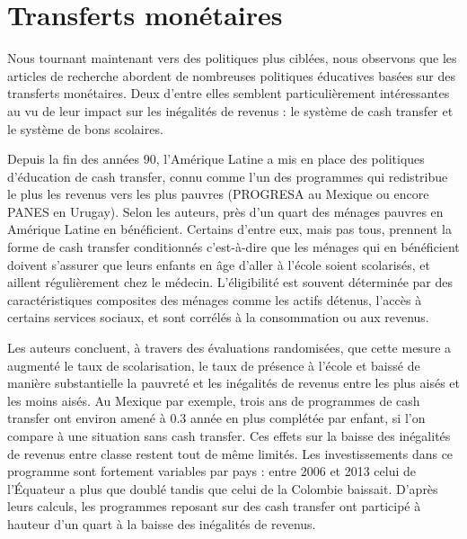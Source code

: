 \documentclass[pagesize, twoside=off, bibliography=totoc, DIV=calc, fontsize=12pt, a4paper, french]{scrartcl}
\begin{document}
\section{Transferts monétaires}

\label{sec_transferts}

Nous tournant maintenant vers des politiques plus ciblées, nous observons que les articles de recherche abordent de nombreuses politiques éducatives basées sur des transferts monétaires. Deux d’entre elles semblent particulièrement intéressantes au vu de leur impact sur les inégalités de revenus : le système de cash transfer et le système de bons scolaires.

Depuis la fin des années 90, l’Amérique Latine a mis en place des politiques d’éducation de cash transfer, connu comme l’un des programmes qui redistribue le plus les revenus vers les plus pauvres (PROGRESA au Mexique ou encore PANES en Urugay). Selon les auteurs, près d’un quart des ménages pauvres en Amérique Latine en bénéficient. Certains d’entre eux, mais pas tous, prennent la forme de cash transfer conditionnés c’est-à-dire que les ménages qui en bénéficient doivent s’assurer que leurs enfants en âge d’aller à l’école soient scolarisés, et aillent régulièrement chez le médecin. L’éligibilité est souvent déterminée par des caractéristiques composites des ménages comme les actifs détenus, l’accès à certains services sociaux, et sont corrélés à la consommation ou aux revenus. 

Les auteurs concluent, à travers des évaluations randomisées, que cette mesure a augmenté le taux de scolarisation, le taux de présence à l’école et baissé de manière substantielle la pauvreté et les inégalités de revenus entre les plus aisés et les moins aisés. Au Mexique par exemple, trois ans de programmes de cash transfer ont environ amené à 0.3 année en plus complétée par enfant, si l’on compare à une situation sans cash transfer. Ces effets sur la baisse des inégalités de revenus entre classe restent tout de même limités. Les investissements dans ce programme sont fortement variables par pays : entre 2006 et 2013 celui de l’Équateur a plus que doublé tandis que celui de la Colombie baissait. D’après leurs calculs, les programmes reposant sur des cash transfer ont participé à hauteur d’un quart à la baisse des inégalités de revenus.
\end{document}
